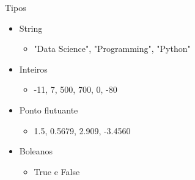 
\begin{frame}[t, fragile]{Tipos}
  \begin{itemize}
    \item String
    \begin{itemize}
      \item "Data Science", "Programming", "Python"
    \end{itemize}
    \item Inteiros
    \begin{itemize}
      \item -11, 7, 500, 700, 0, -80
    \end{itemize}
    \item Ponto flutuante
    \begin{itemize}
      \item 1.5, 0.5679, 2.909, -3.4560
    \end{itemize}
    \item Boleanos 
    \begin{itemize}
      \item True e False
    \end{itemize}
  \end{itemize}
\end{frame}

 